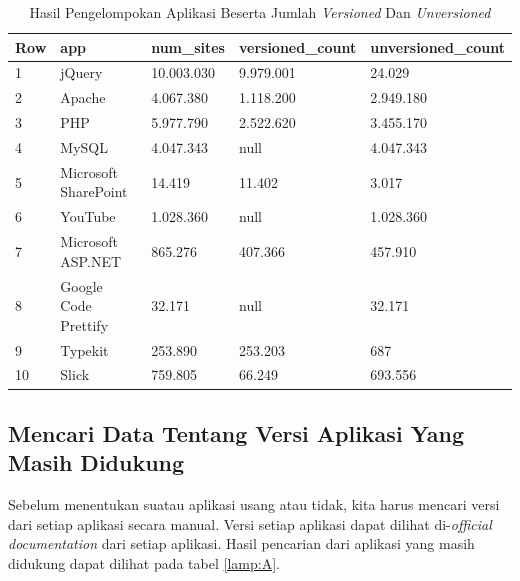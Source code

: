 \begin{table}[H]
\centering
\begin{tabular}{|l|l|l|l|l|}
	\hline
	\textbf{Row} & \textbf{app} & \textbf{num\_sites} & \textbf{versioned\_count} & \textbf{unversioned\_count}\\
	\hline
	1 & jQuery & 10.003.030 & 9.979.001 & 24.029\\
	\hline
	2 & Apache & 4.067.380 & 1.118.200 & 2.949.180\\
	\hline
	3 & PHP & 5.977.790 & 2.522.620 & 3.455.170\\
	\hline
	4 & MySQL & 4.047.343 & null & 4.047.343\\
	\hline
	5 & Microsoft SharePoint & 14.419 & 11.402 & 3.017\\
	\hline
	6 & YouTube & 1.028.360& null & 1.028.360\\
	\hline
	7 & Microsoft ASP.NET & 865.276 & 407.366 & 457.910\\
	\hline
	8 & Google Code Prettify & 32.171 & null & 32.171\\
	\hline
	9 & Typekit & 253.890 & 253.203 & 687\\
	\hline
	10 & Slick & 759.805 & 66.249 & 693.556\\
	\hline
\end{tabular}
\caption{Hasil Pengelompokan Aplikasi Beserta Jumlah \textit{Versioned} Dan \textit{Unversioned}}
\label{table:contoh_langkah3}
\end{table}

\subsection{Mencari Data Tentang Versi Aplikasi Yang Masih Didukung}
Sebelum menentukan suatau aplikasi usang atau tidak, kita harus mencari versi dari setiap aplikasi secara manual. Versi setiap aplikasi dapat dilihat di-\textit{official documentation} dari setiap aplikasi. Hasil pencarian dari aplikasi yang masih didukung dapat dilihat pada tabel \ref{lamp:A}. 

